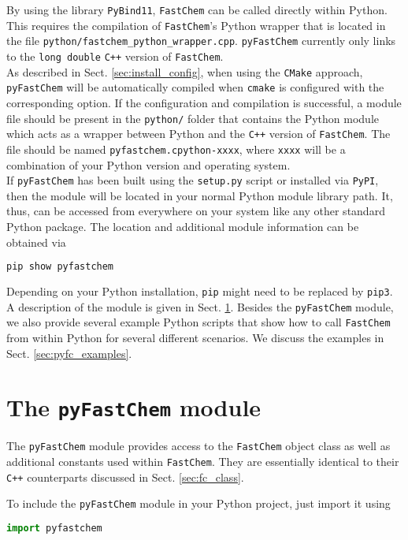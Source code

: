\documentclass[numbers=noenddot]{aux/fcmanual}
\newcommand{\fc}{\texttt{FastChem}\xspace}
\newcommand{\pfc}{\texttt{pyFastChem}\xspace}
\newcommand{\cpp}{\ttt{C++}\xspace}
\newcommand{\pb}{\texttt{PyBind11}\xspace}
\newcommand{\ttt}[1]{\texttt {#1}}
\begin{document}
By using the library \pb, \fc can be called directly within Python. This requires the compilation of \fc's Python wrapper that is located in the file \verb|python/fastchem_python_wrapper.cpp|. \pfc currently only links to the \lstinline!long double! \cpp version of \fc.\\

As described in Sect. \ref{sec:install_config}, when using the \ttt{CMake} approach, \pfc will be automatically compiled when \ttt{cmake} is configured with the corresponding option. If the configuration and compilation is successful, a module file should be present in the \verb|python/| folder that contains the Python module which acts as a wrapper between Python and the \cpp version of \fc. The file should be named \verb|pyfastchem.cpython-xxxx|, where \verb|xxxx| will be a combination of your Python version and operating system.\\ 

If \pfc has been built using the \verb|setup.py| script or installed via \verb|PyPI|, then the module will be located in your normal Python module library path. It, thus, can be accessed from everywhere on your system like any other standard Python package. The location and additional module information can be obtained via
\begin{lstlisting}[language=bash]
  pip show pyfastchem
\end{lstlisting}
Depending on your Python installation, \verb|pip| might need to be replaced by \verb|pip3|.\\


A description of the module is given in Sect. \ref{sec:pyfc_module}. Besides the \pfc module, we also provide several example Python scripts that show how to call \fc from within Python for several different scenarios. We discuss the examples in Sect. \ref{sec:pyfc_examples}.


\section{The \pfc module}
\label{sec:pyfc_module}

The \pfc module provides access to the \fc object class as well as additional constants used within \fc. They are essentially identical to their \cpp counterparts discussed in Sect. \ref{sec:fc_class}.

To include the \pfc module in your Python project, just import it using

\begin{lstlisting}[language=Python]
  import pyfastchem
\end{lstlisting}
\end{document}
